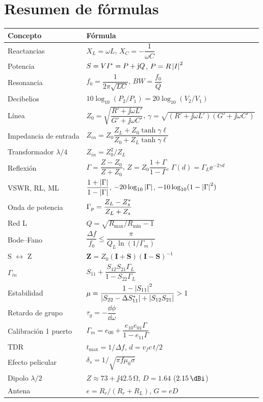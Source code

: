\chapter{Resumen de fórmulas}

\begin{center}
\renewcommand{\arraystretch}{1.55}
\begin{tabularx}{\linewidth}{@{}p{3.4cm}X@{}}\toprule
\textbf{Concepto} & \textbf{Fórmula}\\ \midrule
Reactancias & $X_L = \omega L$, \quad $X_C = -\dfrac{1}{\omega C}$\\
Potencia & $S = VI^{*} = P + \mathrm{j} Q$, \quad $P = R\left|I\right|^2$\\
Resonancia & $f_0 = \dfrac{1}{2\pi\sqrt{LC}}$, \quad $BW = \dfrac{f_0}{Q}$\\
Decibelios & $10\log_{10}(P_2/P_1) = 20\log_{10}(V_2/V_1)$\\
Línea & $Z_0 = \sqrt{\dfrac{R'+\jj\omega L'}{G'+\jj\omega C'}}$, \quad $\gamma = \sqrt{(R'+\jj\omega L')(G'+\jj\omega C')}$\\
Impedancia de entrada & $Z_{in} = Z_0\dfrac{Z_L + Z_0\tanh\gamma\ell}{Z_0 + Z_L\tanh\gamma\ell}$\\
Transformador $\lambda/4$ & $Z_{in} = Z_0^2/Z_L$\\
Reflexión & $\Gamma = \dfrac{Z - Z_0}{Z + Z_0}$, \quad $Z = Z_0\dfrac{1+\Gamma}{1-\Gamma}$, \quad $\Gamma(d) = \Gamma_L\ee^{-2\gamma d}$\\
VSWR, RL, ML & $\dfrac{1+\left|\Gamma\right|}{1-\left|\Gamma\right|}$, \quad $-20\log_{10}\left|\Gamma\right|$, \quad $-10\log_{10}(1-\left|\Gamma\right|^2)$\\
Onda de potencia & $\Gamma_p = \dfrac{Z_L - Z_s^{*}}{Z_L + Z_s}$\\
Red L & $Q = \sqrt{R_{\max}/R_{\min} - 1}$\\
Bode--Fano & $\dfrac{\Delta f}{f_0} \le \dfrac{\pi}{Q_L\ln(1/\Gamma_m)}$\\
S $\leftrightarrow$ Z & $\mathbf Z = Z_0(\mathbf I + \mathbf S)(\mathbf I - \mathbf S)^{-1}$\\
$\Gamma_{in}$ & $S_{11} + \dfrac{S_{12}S_{21}\Gamma_L}{1 - S_{22}\Gamma_L}$\\
Estabilidad & $\mu = \dfrac{1 - \left|S_{11}\right|^2}{\left|S_{22} - \Delta S_{11}^{*}\right| + \left|S_{12}S_{21}\right|} > 1$\\
Retardo de grupo & $\tau_g = -\dfrac{\dd\phi}{\dd\omega}$\\
Calibración 1 puerto & $\Gamma_m = e_{00} + \dfrac{e_{10}e_{01}\Gamma}{1 - e_{11}\Gamma}$\\
TDR & $t_{\max} = 1/\Delta f$, \quad $d = v_f c\,t/2$\\
Efecto pelicular & $\delta_s = 1/\sqrt{\pi f\mu_0\sigma}$\\
Dipolo $\lambda/2$ & $Z \approx 73 + \jj 42.5\,\si{\ohm}$, \quad $D = 1.64$ ($\SI{2.15}{\dBi}$)\\
Antena & $e = R_r/(R_r + R_L)$, \quad $G = eD$\\ \bottomrule
\end{tabularx}
\end{center}

